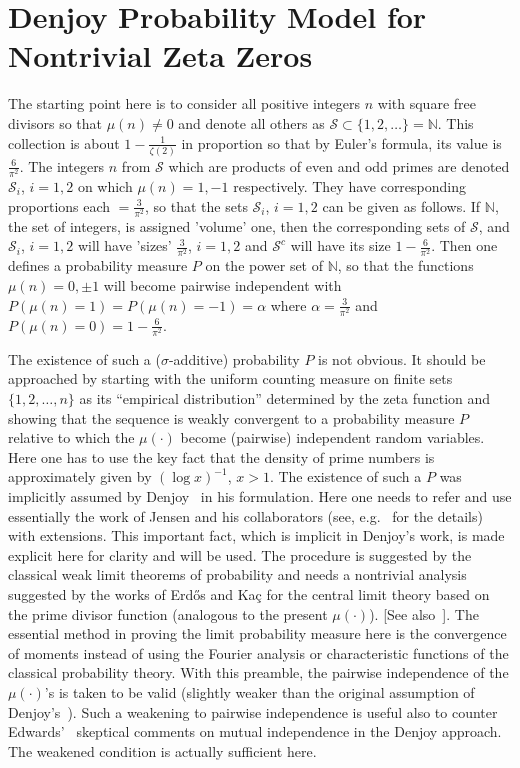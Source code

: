 \documentclass[11pt]{article}
\begin{document}
\section{Denjoy Probability Model for Nontrivial Zeta Zeros}
\label{sec:denjoy}

The starting point here is to consider all positive integers $n$ with square free divisors so that $\mu(n) \neq 0$ and denote all others as $\mathcal{S} \subset \{1, 2, \ldots\} = \mathbb{N}$. This collection is about $1 - \frac{1}{\zeta(2)}$ in proportion so that by Euler's formula, its value is $\frac{6}{\pi^2}$. The integers $n$ from $\mathcal{S}$ which are products of even and odd primes are denoted $\mathcal{S}_i$, $i = 1, 2$ on which $\mu(n) = 1, -1$ respectively. They have corresponding proportions each $= \frac{3}{\pi^2}$, so that the sets $\mathcal{S}_i$, $i = 1, 2$ can be given as follows. If $\mathbb{N}$, the set of integers, is assigned 'volume' one, then the corresponding sets of $\mathcal{S}$, and $\mathcal{S}_i$, $i = 1, 2$ will have 'sizes' $\frac{3}{\pi^2}$, $i = 1, 2$ and $\mathcal{S}^c$ will have its size $1 - \frac{6}{\pi^2}$. Then one defines a probability measure $P$ on the power set of $\mathbb{N}$, so that the functions $\mu(n) = 0, \pm 1$ will become pairwise independent with $P(\mu(n) = 1) = P(\mu(n) = -1) = \alpha$ where $\alpha = \frac{3}{\pi^2}$ and $P(\mu(n) = 0) = 1 - \frac{6}{\pi^2}$.

The existence of such a ($\sigma$-additive) probability $P$ is not obvious. It should be approached by starting with the uniform counting measure on finite sets $\{1, 2, \ldots, n\}$ as its ``empirical distribution'' determined by the zeta function and showing that the sequence is weakly convergent to a probability measure $P$ relative to which the $\mu(\cdot)$ become (pairwise) independent random variables. Here one has to use the key fact that the density of prime numbers is approximately given by $(\log x)^{-1}$, $x > 1$. The existence of such a $P$ was implicitly assumed by Denjoy~\cite{denjoy} in his formulation. Here one needs to refer and use essentially the work of Jensen and his collaborators (see, e.g.~\cite{laurincikas} for the details) with extensions. This important fact, which is implicit in Denjoy's work, is made explicit here for clarity and will be used. The procedure is suggested by the classical weak limit theorems of probability and needs a nontrivial analysis suggested by the works of Erdős and Kaç for the central limit theory based on the prime divisor function (analogous to the present $\mu(\cdot)$). [See also~\cite{billingsley,kac}]. The essential method in proving the limit probability measure here is the convergence of moments instead of using the Fourier analysis or characteristic functions of the classical probability theory. With this preamble, the pairwise independence of the $\mu(\cdot)$'s is taken to be valid (slightly weaker than the original assumption of Denjoy's~\cite{denjoy}). Such a weakening to pairwise independence is useful also to counter Edwards'~\cite{edwards} skeptical comments on mutual independence in the Denjoy approach. The weakened condition is actually sufficient here.
\end{document}
